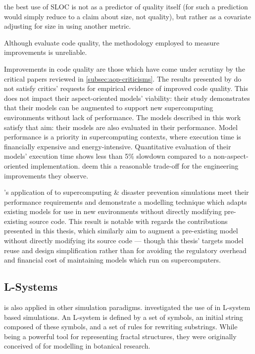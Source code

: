 \begin{displayquote}
    \textelp{}the best use of SLOC is not as a predictor of quality itself (for
such a prediction would simply reduce to a claim about size, not quality), but
rather as a covariate adjusting for size in using another metric.
\end{displayquote}

Although \citet{ionescu2009aspect} evaluate code quality, the methodology
employed to measure improvements is unreliable.

Improvements in code quality are those which have come under scrutiny by the
critical papers reviewed in \cref{subsec:aop-criticisms}. The results presented
by \citeauthor{ionescu2009aspect} do not satisfy critics' requests for empirical
evidence of improved code quality. This does not impact their aspect-oriented
models' viability: their study demonstrates that their models can be augmented
to support new supercomputing environments without lack of performance. The
models described in this work satisfy that aim: their models are also evaluated
in their performance. Model performance is a priority in supercomputing
contexts, where execution time is financially expensive and energy-intensive.
Quantitative evaluation of their models' execution time shows less than 5\%
slowdown compared to a non-aspect-oriented implementation.
\citeauthor{ionescu2009aspect} deem this a reasonable trade-off for the
engineering improvements they observe.

\citeauthor{ionescu2009aspect}'s application of \aspectorientation{} to
supercomputing \& disaster prevention simulations meet their performance
requirements and demonstrate a modelling technique which adapts existing models
for use in new environments without directly modifying pre-existing source code.
This result is notable with regards the contributions presented in this thesis,
which similarly aim to augment a pre-existing model without directly modifying
its source code --- though this thesis' targets model reuse and design
simplification rather than for avoiding the regulatory overhead and financial
cost of maintaining models which run on supercomputers.


\subsection{\AspectOriented{} L-Systems}
\Aspectorientation{} is also applied in other simulation paradigms.
\citet{Cieslak_2011} investigated the use of \aspectorientation{} in L-system
based simulations. An L-system\cite{lindenmayer1968lsystem} is defined by a set
of symbols, an initial string composed of these symbols, and a set of rules for
rewriting substrings. While being a powerful tool for representing fractal
structures, they were originally conceived of for modelling in botanical
research.

